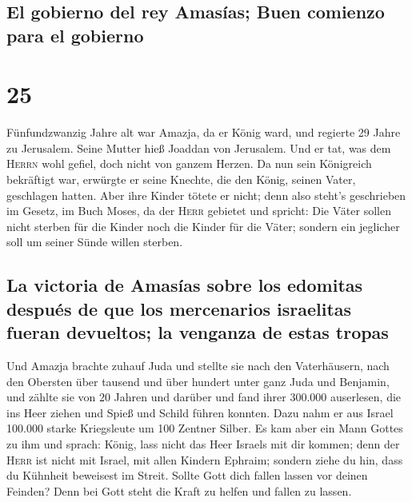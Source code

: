 \hypertarget{el-gobierno-del-rey-amasuxedas-buen-comienzo-para-el-gobierno}{%
\subsection{El gobierno del rey Amasías; Buen comienzo para el
gobierno}\label{el-gobierno-del-rey-amasuxedas-buen-comienzo-para-el-gobierno}}

\hypertarget{section-24}{%
\section{25}\label{section-24}}

 Fünfundzwanzig Jahre alt war Amazja, da er König ward,
und regierte 29 Jahre zu Jerusalem. Seine Mutter hieß Joaddan von
Jerusalem.  Und er tat, was dem \textsc{Herrn} wohl
gefiel, doch nicht von ganzem Herzen.  Da nun sein
Königreich bekräftigt war, erwürgte er seine Knechte, die den König,
seinen Vater, geschlagen hatten.  Aber ihre Kinder tötete
er nicht; denn also steht's geschrieben im Gesetz, im Buch Moses, da der
\textsc{Herr} gebietet und spricht: Die Väter sollen nicht sterben für
die Kinder noch die Kinder für die Väter; sondern ein jeglicher soll um
seiner Sünde willen sterben.

\hypertarget{la-victoria-de-amasuxedas-sobre-los-edomitas-despuuxe9s-de-que-los-mercenarios-israelitas-fueran-devueltos-la-venganza-de-estas-tropas}{%
\subsection{La victoria de Amasías sobre los edomitas después de que los
mercenarios israelitas fueran devueltos; la venganza de estas
tropas}\label{la-victoria-de-amasuxedas-sobre-los-edomitas-despuuxe9s-de-que-los-mercenarios-israelitas-fueran-devueltos-la-venganza-de-estas-tropas}}

 Und Amazja brachte zuhauf Juda und stellte sie nach den
Vaterhäusern, nach den Obersten über tausend und über hundert unter ganz
Juda und Benjamin, und zählte sie von 20 Jahren und darüber und fand
ihrer 300.000 auserlesen, die ins Heer ziehen und Spieß und Schild
führen konnten.  Dazu nahm er aus Israel 100.000 starke
Kriegsleute um 100 Zentner Silber.  Es kam aber ein Mann
Gottes zu ihm und sprach: König, lass nicht das Heer Israels mit dir
kommen; denn der \textsc{Herr} ist nicht mit Israel, mit allen Kindern
Ephraim;  sondern ziehe du hin, dass du Kühnheit beweisest
im Streit. Sollte Gott dich fallen lassen vor deinen Feinden? Denn bei
Gott steht die Kraft zu helfen und fallen zu lassen.

